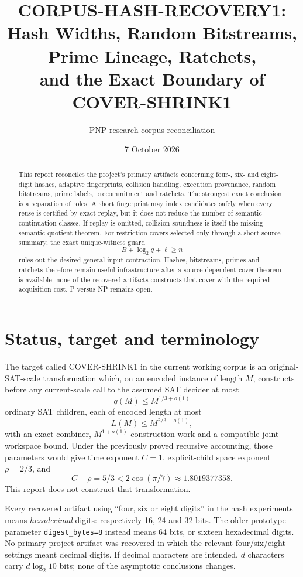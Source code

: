 \documentclass[11pt]{article}
\title{CORPUS-HASH-RECOVERY1:\\Hash Widths, Random Bitstreams, Prime Lineage, Ratchets,\\and the Exact Boundary of COVER-SHRINK1}
\author{PNP research corpus reconciliation}
\date{7 October 2026}
\newcommand{\gammats}{2\cos(\pi/7)}
\begin{document}
\maketitle

\begin{abstract}
This report reconciles the project's primary artifacts concerning four-, six-
and eight-digit hashes, adaptive fingerprints, collision handling, execution
provenance, random bitstreams, prime labels, precommitment and ratchets.  The
strongest exact conclusion is a separation of roles.  A short fingerprint may
index candidates safely when every reuse is certified by exact replay, but it
does not reduce the number of semantic continuation classes.  If replay is
omitted, collision soundness is itself the missing semantic quotient theorem.
For restriction covers selected only through a short source summary, the exact
unique-witness guard
\[
        B+\log_2 q+\ell\ge n
\]
rules out the desired general-input contraction.  Hashes, bitstreams, primes
and ratchets therefore remain useful infrastructure after a source-dependent
cover theorem is available; none of the recovered artifacts constructs that
cover with the required acquisition cost.  P versus NP remains open.
\end{abstract}

\section{Status, target and terminology}

The target called \textsc{COVER-SHRINK1} in the current working corpus is an
original-SAT-scale transformation which, on an encoded instance of length
$M$, constructs before any current-scale call to the assumed SAT decider at
most
\[
       q(M)\le M^{1/3+o(1)}
\]
ordinary SAT children, each of encoded length at most
\[
       L(M)\le M^{2/3+o(1)},
\]
with an exact combiner, $M^{1+o(1)}$ construction work and a compatible joint
workspace bound.  Under the previously proved recursive accounting, those
parameters would give time exponent $C=1$, explicit-child space exponent
$\rho=2/3$, and
\[
        C+\rho=5/3<\gammats\approx1.8019377358.
\]
This report does not construct that transformation.

Every recovered artifact using ``four, six or eight digits'' in the hash
experiments means \emph{hexadecimal} digits: respectively 16, 24 and 32 bits.
The older prototype parameter \texttt{digest\_bytes=8} instead means 64 bits,
or sixteen hexadecimal digits.  No primary project artifact was recovered in
which the relevant four/six/eight settings meant decimal digits.  If decimal
characters are intended, $d$ characters carry $d\log_2 10$ bits; none of the
asymptotic conclusions changes.
\end{document}
